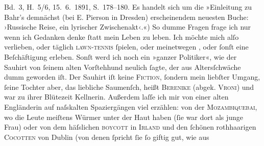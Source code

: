 \begin{ledgroupsized}[t]{13cm}
{{{                     Bd. 3, H. 5/6, 15. 6. 1891, S. 178–180. Es handelt sich um
                  die »Einleitung zu Bahr’s demnächst
                     (bei E. Pierson in Dresden) erscheinendem neuesten Buche: ›Russische Reise, ein lyrischer Zwischenakt‹.«}}}\label{K_L00023_5h})\pend
           \pstart
           So dumme Fragen frage ich nur wenn ich Gedanken denke ſtatt mein Leben zu leben. Ich
               möchte mich alſo verlieben, oder täglich \textsc{lawn-tennis}{ }ſpielen, oder meinetwegen \label{K_L00023_6v}\label{K_L00023_6h}, oder
               ſonſt eine Beſchäftigung erleben.\pend
           \pstart
           Sonſt werd ich noch ein »ganzer Politiker«, wie der Sauhirt von ſeinem alten Vorſtehhund neulich ſagte, der aus
               Altersſchwäche dumm geworden iſt. Der Sauhirt iſt keine \textsc{Fiction},
               ſondern mein liebſter Umgang, ſeine Tochter aber, das liebliche Saumenſch, heißt \textsc{Berenike} (abgek. \textsc{Vroni}) und war zu ihrer Blütezeit Kellnerin. Außerdem laſſe ich mir von einer alten
                  Engländerin auf naſskalten
               Spaziergängen viel erzählen: von der \textsc{Mozambiquebai}, wo die Leute meiſtens Würmer unter der Haut haben (ſie war dort als
               junge Frau) oder von dem häſslichen \textsc{boycott} in \textsc{Irland} und den ſchönen rothhaarigen \textsc{Cocotten} von Dublin (von denen ſpricht ſie ſo giftig gut, wie aus

\end{ledgroupsized}
